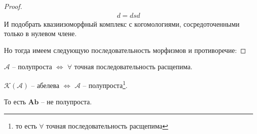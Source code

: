\documentclass[../main.tex]{subfiles}
\begin{document}
\begin{to_ex}
\begin{proof}
\begin{align*}
    d = dsd
\end{align*}
И подобрать квазиизоморфный комплекс с когомологиями, сосредоточенными только в нулевом члене.
\bee
{}
\eee
Но тогда имеем следующую последовательность морфизмов и противоречие:
\bee
{}
\eee
\end{proof}
\end{to_ex}
\begin{to_def}
$\mathcal{A}$ -- полупроста $\Leftrightarrow$ $\forall$ точная последовательность расщепима.
\end{to_def}
\begin{to_claim}
$\mathcal{K(A)}$ -- абелева $\Leftrightarrow$ $\mathcal{A}$ -- полупроста\footnote{то есть $\forall$ точная последовательность расщепима}.
\end{to_claim}
\begin{to_ex}
\bee
{}
\eee
То есть $\mathbf{Ab}$ -- не полупроста.
\end{to_ex}
\end{document}
